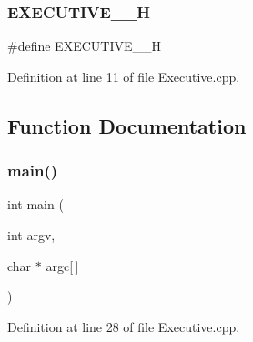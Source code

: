 \subsubsection{\texorpdfstring{E\+X\+E\+C\+U\+T\+I\+V\+E\+\_\+\+\_\+H}{EXECUTIVE\_\_H}}
{\footnotesize\ttfamily \#define E\+X\+E\+C\+U\+T\+I\+V\+E\+\_\+\+\_\+H}



Definition at line 11 of file Executive.\+cpp.



\subsection{Function Documentation}
\mbox{\label{group___executive_gac4c0f8a8146b128f1b8f920e3a9c3b1e}} 
\subsubsection{\texorpdfstring{main()}{main()}}
{\footnotesize\ttfamily int main (\begin{DoxyParamCaption}\item[{int}]{argv,  }\item[{char $\ast$}]{argc\mbox{[}$\,$\mbox{]} }\end{DoxyParamCaption})}



Definition at line 28 of file Executive.\+cpp.

